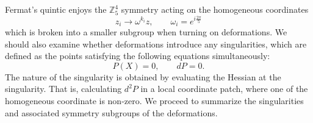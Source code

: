 Fermat's quintic enjoys the $\mathbb Z_5^4$ symmetry acting on the homogeneous coordinates 
\begin{equation}
  z_i \to \omega^{k_i} z, \qquad \omega_i=e^{i\frac{2\pi}{5}}
  \label{eq:sim}
\end{equation}
which is broken into a smaller subgroup when turning on deformations.
We should also examine whether deformations introduce any singularities, which
are defined as the points 
satisfying the following equations simultaneously:
\begin{equation}
  P(X)=0, \qquad dP=0.
\end{equation}
The nature of the singularity is obtained by evaluating the Hessian at the singularity.
That is, calculating $d^2 P$ in a local coordinate patch, where one of the homogeneous coordinate is non-zero.
We proceed to summarize the singularities and associated symmetry subgroups of the deformations.
